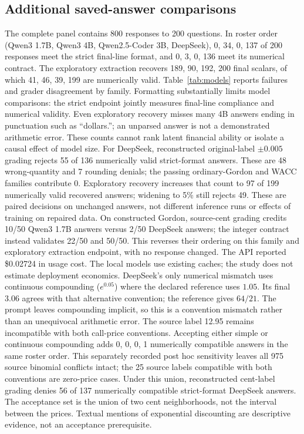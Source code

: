 \subsection{Additional saved-answer comparisons}
The complete panel contains 800 responses to 200 questions. In roster order (Qwen3 1.7B, Qwen3 4B, Qwen2.5-Coder 3B, DeepSeek), 0, 34, 0, 137 of 200 responses meet the strict final-line format, and 0, 3, 0, 136 meet its numerical contract. The exploratory extraction recovers 189, 90, 192, 200 final scalars, of which 41, 46, 39, 199 are numerically valid. Table~\ref{tab:models} reports failures and grader disagreement by family. Formatting substantially limits model comparisons: the strict endpoint jointly measures final-line compliance and numerical validity. Even exploratory recovery misses many 4B answers ending in punctuation such as ``dollars.''; an unparsed answer is not a demonstrated arithmetic error. These counts cannot rank latent financial ability or isolate a causal effect of model size.
For DeepSeek, reconstructed original-label $\pm0.005$ grading rejects 55 of 136 numerically valid strict-format answers. These are 48 wrong-quantity and 7 rounding denials; the passing ordinary-Gordon and WACC families contribute 0. Exploratory recovery increases that count to 97 of 199 numerically valid recovered answers; widening to 5\% still rejects 49. These are paired decisions on unchanged answers, not different inference runs or effects of training on repaired data. On constructed Gordon, source-cent grading credits 10/50 Qwen3 1.7B answers versus 2/50 DeepSeek answers; the integer contract instead validates 22/50 and 50/50. This reverses their ordering on this family and exploratory extraction endpoint, with no response changed. The API reported \$0.02724 in usage cost. The local models use existing caches; the study does not estimate deployment economics.
DeepSeek's only numerical mismatch uses continuous compounding (\(e^{0.05}\)) where the declared reference uses \(1.05\). Its final 3.06 agrees with that alternative convention; the reference gives \(64/21\). The prompt leaves compounding implicit, so this is a convention mismatch rather than an unequivocal arithmetic error. The source label 12.95 remains incompatible with both call-price conventions.
Accepting either simple or continuous compounding adds 0, 0, 0, 1 numerically compatible answers in the same roster order. This separately recorded post hoc sensitivity leaves all 975 source binomial conflicts intact; the 25 source labels compatible with both conventions are zero-price cases. Under this union, reconstructed cent-label grading denies 56 of 137 numerically compatible strict-format DeepSeek answers. The acceptance set is the union of two cent neighborhoods, not the interval between the prices. Textual mentions of exponential discounting are descriptive evidence, not an acceptance prerequisite.


